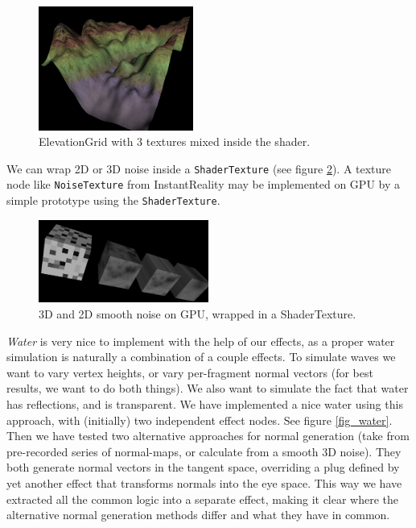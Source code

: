 \documentclass{egpubl}
\begin{document}
\begin{figure}[H]
  \centering
  \includegraphics[width=2in]{terrain}
  \caption{ElevationGrid with 3 textures mixed inside the shader.}
  \label{fig_terrain}
\end{figure}

We can wrap 2D or 3D noise inside a \texttt{ShaderTexture}
(see figure \ref{fig_noise}).
A texture node like \texttt{NoiseTexture} from InstantReality
\cite{instant:noisetex}
may be implemented on GPU by a simple prototype using the \texttt{ShaderTexture}.

\begin{figure}[H]
  \centering
  \includegraphics[width=2.2in]{noise-cropped}
  \caption{3D and 2D smooth noise on GPU, wrapped in a ShaderTexture.}
  \label{fig_noise}
\end{figure}

\emph{Water} is very nice to implement with the help of our effects,
as a proper water simulation
is naturally a combination of a couple effects.
To simulate waves we want to vary vertex
heights, or vary per-fragment normal vectors (for best results,
we want to do both things).
We also want to simulate the fact that water has reflections, and
is transparent. We have implemented a nice water using this approach,
with (initially) two independent effect nodes. See figure \ref{fig_water}.
Then we have tested two alternative
approaches for normal generation (take from pre-recorded series of normal-maps,
or calculate from a smooth 3D noise). They both generate normal
vectors in the tangent space, overriding a plug defined by yet another effect
that transforms normals into the eye space.
This way we have extracted all the common logic into a separate effect,
making it clear where the alternative normal generation methods differ
and what they have in common.
\end{document}
